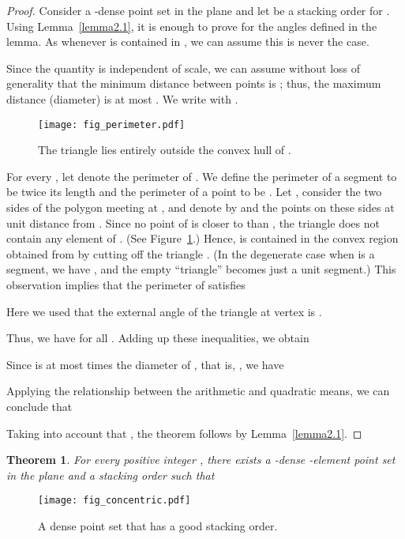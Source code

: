 \documentclass[11pt]{article}
\newtheorem{thm}{Theorem}             \newtheorem{lem}[thm]{Lemma}
\begin{document}
\begin{proof}
Consider a -dense point set  in the
plane and let  be a stacking order for . Using Lemma~\ref{lemma2.1}, it
is enough to prove  for the angles  defined
in the lemma. As  whenever  is contained in
, we can assume this is never the case.

Since the quantity  is independent of scale, we can assume without
loss of generality that the minimum distance between points is
; thus, the maximum distance (diameter) is at most . We write
 with .

\begin{figure}
\centerline{\texttt{[image: fig\_perimeter.pdf]}}
\caption{\label{fig_perimeter}The triangle  lies entirely outside the convex hull of .}
\end{figure}

For every , let  denote the perimeter of
. We define the perimeter of a segment to be
twice its length and the perimeter of a point to be . Let
, consider the two sides of the polygon  meeting at , and denote by  and  the points on these sides
at unit distance from . Since no point of  is closer to  than
, the triangle  does not contain any element of . (See Figure~\ref{fig_perimeter}.) Hence,  is contained in the
convex region obtained from  by cutting off the
triangle . (In the degenerate case when  is a
segment, we have ,
and the empty ``triangle'' becomes just a unit segment.) This observation implies that the perimeter of  satisfies

Here we used that the external angle of the triangle  at vertex  is .

Thus, we have 
for all . Adding up these inequalities, we obtain

Since  is at most  times the diameter of , that is, , we have

Applying the relationship between the arithmetic and quadratic means, we can conclude that


Taking into account that , the theorem follows by Lemma~\ref{lemma2.1}.
\end{proof}

{
\renewcommand{\thethm}{3}
\begin{thm}For every positive integer , there exists a -dense -element point set  in the plane and a stacking order  such that

\end{thm}
\addtocounter{thm}{-1}
}

\begin{figure}
\centerline{\texttt{[image: fig\_concentric.pdf]}}
\caption{\label{fig_concentric}A dense point set that has a good stacking order.}
\end{figure}
\end{document}
